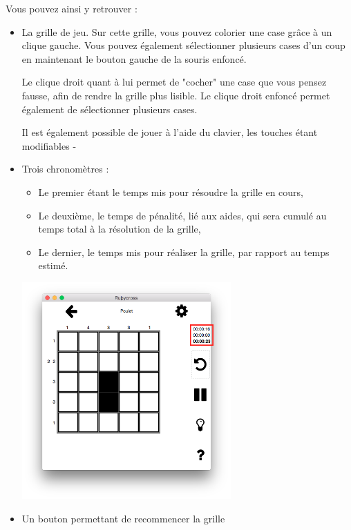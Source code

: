 \documentclass[a4paper, 12pt]{report}
\begin{document}
            Vous pouvez ainsi y retrouver :
            \begin{itemize}
                \item La grille de jeu.
                Sur cette grille, vous pouvez colorier une case grâce à un clique gauche. Vous pouvez également sélectionner plusieurs cases d'un coup en maintenant le bouton gauche de la souris enfoncé.
                
                Le clique droit quant à lui permet de "cocher" une case que vous pensez fausse, afin de rendre la grille plus lisible. Le clique droit enfoncé permet également de sélectionner plusieurs cases.
                
                Il est également possible de jouer à l'aide du clavier, les touches étant modifiables -
                \item Trois chronomètres : 
                \begin{itemize}
                    \item Le premier étant le temps mis pour résoudre la grille en cours,
                    \item Le deuxième, le temps de pénalité, lié aux aides, qui sera cumulé au temps total à la résolution de la grille,
                    \item Le dernier, le temps mis pour réaliser la grille, par rapport au temps estimé.
                \end{itemize}
                \begin{minipage}{\linewidth}
                    \centering
			        \includegraphics[width=8cm]{screenTimer.png}
	            \end{minipage}
                \item Un bouton permettant de recommencer la grille

\end{itemize}
\end{document}
